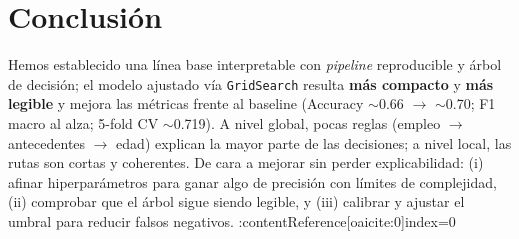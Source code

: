 \section{Conclusión}

Hemos establecido una línea base interpretable con \emph{pipeline} reproducible y árbol de decisión; el modelo ajustado vía \texttt{GridSearch} resulta \textbf{más compacto} y \textbf{más legible} y mejora las métricas frente al baseline (Accuracy $\sim$0.66 $\rightarrow$ $\sim$0.70; F1 macro al alza; 5-fold CV $\sim$0.719). A nivel global, pocas reglas (empleo $\rightarrow$ antecedentes $\rightarrow$ edad) explican la mayor parte de las decisiones; a nivel local, las rutas son cortas y coherentes. De cara a mejorar sin perder explicabilidad: (i) afinar hiperparámetros para ganar algo de precisión con límites de complejidad, (ii) comprobar que el árbol sigue siendo legible, y (iii) calibrar y ajustar el umbral para reducir falsos negativos. :contentReference[oaicite:0]{index=0}

